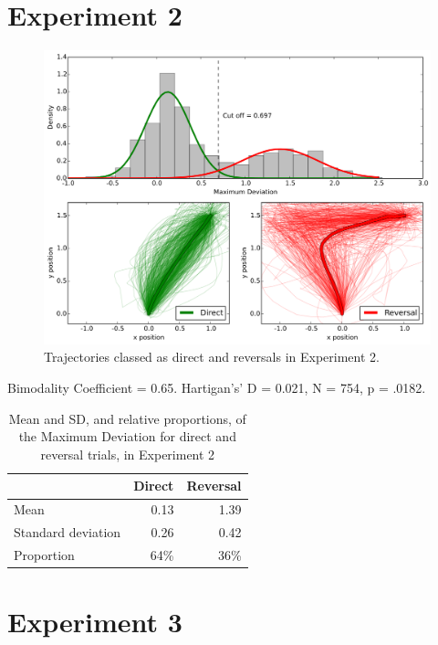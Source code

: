 \newpage
\FloatBarrier
\section*{Experiment 2}\label{experiment-2}

\begin{figure}[ht]
  \centering
  \includegraphics[width=\textwidth]{imgs/reversals/exp2-reversals}
  \caption[]{
    \label{fig:exp2-reversals}
    Trajectories classed as direct and reversals in Experiment 2.
  }
\end{figure}


Bimodality Coefficient = 0.65.
Hartigan's' D = 0.021, N = 754, p = .0182.

\begin{table}[hp]
  \centering
  \caption[]{
    Mean and SD, and relative proportions, of the Maximum Deviation for direct and reversal trials, in Experiment 2
    \label{tab:appendix-reversals-2}
  }
  \begin{tabular}{lrr}
    \toprule
    &   Direct &   Reversal \\
    \midrule
    Mean               &     0.13 &             1.39 \\
    Standard deviation &     0.26 &             0.42 \\
    Proportion         &    64\%    &            36\%    \\
    \bottomrule
  \end{tabular}
\end{table}


\newpage
\FloatBarrier
\section*{Experiment 3}\label{experiment-3}

